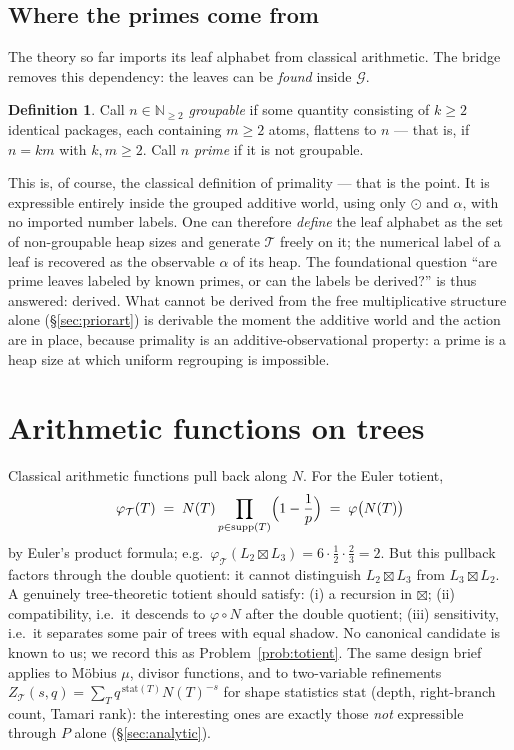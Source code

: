 \documentclass[11pt]{article}
\newcommand{\cT}{\mathcal{T}}   %
\newcommand{\cG}{\mathcal{G}}   %
\newcommand{\NN}{\mathbb{N}}
\DeclareMathOperator{\supp}{supp}
\numberwithin{equation}{section}
\theoremstyle{plain}
\theoremstyle{definition}
\newtheorem{definition}[theorem]{Definition}
\theoremstyle{remark}
\begin{document}
\subsection{Where the primes come from}\label{sec:primesfrom}

The theory so far imports its leaf alphabet from classical arithmetic. The bridge
removes this dependency: the leaves can be \emph{found} inside $\cG$.

\begin{definition}\label{def:groupable}
Call $n \in \NN_{\ge 2}$ \emph{groupable} if some quantity consisting of $k \ge 2$
identical packages, each containing $m \ge 2$ atoms, flattens to $n$ --- that is, if
$n = km$ with $k, m \ge 2$. Call $n$ \emph{prime} if it is not groupable.
\end{definition}

This is, of course, the classical definition of primality --- that is the point. It is
expressible entirely inside the grouped additive world, using only $\odot$ and
$\alpha$, with no imported number labels. One can therefore \emph{define} the leaf
alphabet as the set of non-groupable heap sizes and generate $\cT$ freely on it; the
numerical label of a leaf is recovered as the observable $\alpha$ of its heap. The
foundational question ``are prime leaves labeled by known primes, or can the labels be
derived?'' is thus answered: derived. What cannot be derived from the free multiplicative
structure alone (\S\ref{sec:priorart}) is derivable the moment the additive world and the
action are in place, because primality is an additive-observational property: a prime is
a heap size at which uniform regrouping is impossible.

\section{Arithmetic functions on trees}\label{sec:functions}

Classical arithmetic functions pull back along $N$. For the Euler totient,
\[
\varphi_\cT(T) \;=\; N(T) \prod_{p \in \supp(T)} \Bigl(1 - \frac1p\Bigr)
\;=\; \varphi\bigl(N(T)\bigr)
\]
by Euler's product formula; e.g.\ $\varphi_\cT(L_2 \boxtimes L_3) = 6\cdot\tfrac12\cdot\tfrac23 = 2$.
But this pullback factors through the double quotient: it cannot distinguish
$L_2\boxtimes L_3$ from $L_3 \boxtimes L_2$. A genuinely tree-theoretic totient should
satisfy: (i) a recursion in $\boxtimes$; (ii) compatibility, i.e.\ it descends to
$\varphi \circ N$ after the double quotient; (iii) sensitivity, i.e.\ it separates some
pair of trees with equal shadow. No canonical candidate is known to us; we record this
as Problem~\ref{prob:totient}. The same design brief applies to M\"obius $\mu$,
divisor functions, and to two-variable refinements
$Z_\cT(s, q) = \sum_T q^{\,\mathrm{stat}(T)} N(T)^{-s}$ for shape statistics
$\mathrm{stat}$ (depth, right-branch count, Tamari rank): the interesting ones are
exactly those \emph{not} expressible through $P$ alone (\S\ref{sec:analytic}).
\end{document}
